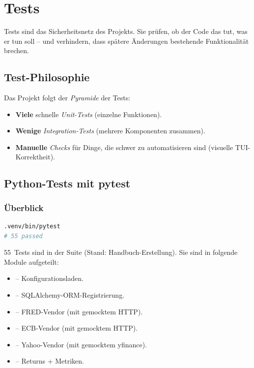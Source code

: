 
\chapter{Tests}

\label{ch:tests}

Tests sind das Sicherheitsnetz des Projekts. Sie prüfen, ob der
Code das tut, was er tun soll -- und verhindern, dass spätere
Änderungen bestehende Funktionalität brechen.

\section{Test-Philosophie}

\begin{merke}
Das Projekt folgt der \emph{Pyramide} der Tests:

\begin{itemize}
  \item \textbf{Viele} schnelle \emph{Unit-Tests} (einzelne Funktionen).
  \item \textbf{Wenige} \emph{Integration-Tests} (mehrere
        Komponenten zusammen).
  \item \textbf{Manuelle} \emph{Checks} für Dinge, die schwer zu
        automatisieren sind (visuelle TUI-Korrektheit).
\end{itemize}
\end{merke}

\section{Python-Tests mit pytest}

\subsection{Überblick}

\begin{lstlisting}[language=bash, caption={Python-Tests laufen}]
.venv/bin/pytest
# 55 passed
\end{lstlisting}

55~Tests sind in der Suite (Stand: Handbuch-Erstellung). Sie sind
in folgende Module aufgeteilt:

\begin{itemize}
  \item {} -- Konfigurationsladen.
  \item {} -- SQLAlchemy-ORM-Registrierung.
  \item {} -- FRED-Vendor (mit gemocktem
        HTTP).
  \item {} -- ECB-Vendor (mit gemocktem HTTP).
  \item {} -- Yahoo-Vendor (mit
        gemocktem yfinance).
  \item {} -- Returns + Metriken.
\end{itemize}

